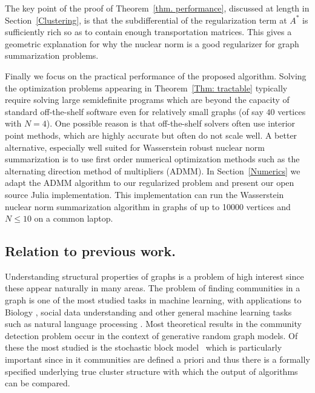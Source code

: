 \documentclass[12pt]{amsart}
\theoremstyle{remark}
\begin{document}
The key point of the proof of Theorem~\ref{thm. performance}, discussed at length in Section~\ref{Clustering}, is that the subdifferential of the regularization term at $A^*$ is sufficiently rich so as to contain enough transportation matrices. This gives a geometric explanation for why the nuclear norm is a good regularizer for graph summarization problems.

 
Finally we focus on the practical performance of the proposed algorithm. Solving the optimization problems appearing in Theorem~\ref{Thm: tractable} typically require solving large semidefinite programs which are beyond the  capacity of standard off-the-shelf software even for relatively small graphs (of say $40$ vertices with $N=4$). One possible reason is that off-the-shelf solvers often use interior point methods, which are highly accurate but often do not scale well. A better alternative, especially well suited for Wasserstein robust nuclear norm summarization is to use first order numerical optimization methods such as the alternating direction method of multipliers (ADMM). In Section~\ref{Numerics} we adapt the ADMM algorithm to our regularized problem and present our open source Julia implementation. This implementation can run the Wasserstein nuclear norm summarization algorithm in graphs of up to 10000 vertices and $N\leq 10$ on a common laptop. 

\subsection{Relation to previous work.}
\label{Sec: PreviousWork}

Understanding structural properties of graphs is a problem of high interest since these appear naturally in many areas. The problem of finding communities in a graph is one of the most studied tasks in machine learning, with  applications to Biology \cite{cabreros2016detecting, cline2007integration,xu2002clustering}, social data understanding \cite{domingos2001mining,mishra2007clustering,newman2002random} and other general machine learning tasks such as natural language processing \cite{collobert2011natural,ratinov2009design}. Most theoretical results in the community detection problem occur in the context of generative random graph models. Of these the most studied is the stochastic block model~\cite{abbe2017community} which is particularly important since in it communities are defined a priori and thus there is a formally specified underlying true cluster structure with which the output of algorithms can be compared.
\end{document}
